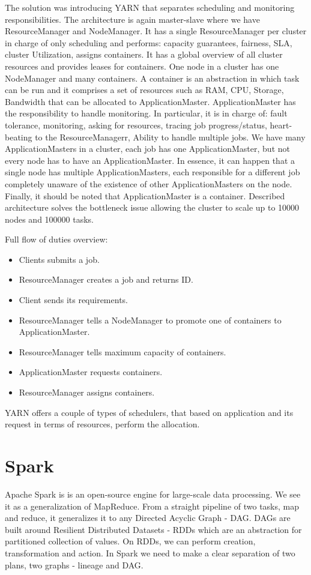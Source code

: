 The solution was introducing YARN that separates scheduling and monitoring responsibilities. The architecture is again master-slave where we have ResourceManager and NodeManager. It has a single ResourceManager per cluster in charge of only scheduling and performs: capacity guarantees, fairness, SLA, cluster Utilization, assigns containers. It has a global overview of all cluster resources and provides leases for containers. One node in a cluster has one NodeManager and many containers. A container is an abstraction in which task can be run and it comprises a set of resources such as RAM, CPU, Storage, Bandwidth that can be allocated to ApplicationMaster. ApplicationMaster has the responsibility to handle monitoring. In particular, it is in charge of: fault tolerance, monitoring, asking for resources, tracing job progress/status, heart-beating to the ResourceManagerr, Ability to handle multiple jobs. We have many ApplicationMasters in a cluster, each job has one ApplicationMaster, but not every node has to have an ApplicationMaster. In essence, it can happen that a single node has multiple ApplicationMasters, each responsible for a different job completely unaware of the existence of other ApplicationMasters on the node. Finally, it should be noted that ApplicationMaster is a container. Described architecture solves the bottleneck issue allowing the cluster to scale up to 10000 nodes and 100000 tasks. \cite{BigDataCourse} %

Full flow of duties overview:
\begin{itemize}
	\item Clients submits a job. 
	\item ResourceManager creates a job and returns ID. \item Client sends its requirements. 
	\item ResourceManager tells a NodeManager to promote one of containers to ApplicationMaster. 
	\item ResourceManager tells maximum capacity of containers. 
	\item ApplicationMaster requests containers. 
	\item ResourceManager assigns containers.
\end{itemize}


YARN offers a couple of types of schedulers, that based on application and its request in terms of resources, perform the allocation.

\section{Spark}
Apache Spark \cite{ApacheSpark} \cite{SparkDefinitiveGuide} \cite{LearningSpark} is is an open-source engine for large-scale data processing. We see it as a generalization of MapReduce. From a straight pipeline of two tasks, map and reduce, it generalizes it to any Directed Acyclic Graph - DAG. DAGs are built around Resilient Distributed Datasets - RDDs \cite{RDD} which are an abstraction for partitioned collection of values. On RDDs, we can perform creation, transformation and action. In Spark we need to make a clear separation of two plans, two graphs - lineage and DAG.

